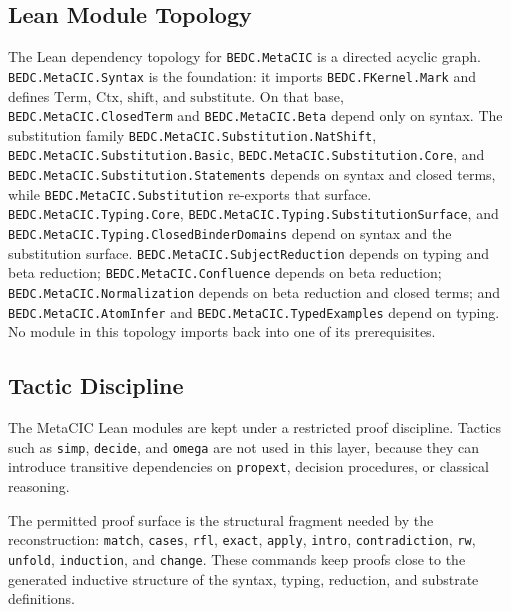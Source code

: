 \subsection{Lean Module Topology}\label{subsec:reconstruction-module-topology}

The Lean dependency topology for \texttt{BEDC.MetaCIC} is a directed acyclic
graph. \texttt{BEDC.MetaCIC.Syntax} is the foundation: it imports
\texttt{BEDC.FKernel.Mark} and defines $\mathrm{Term}$, $\mathrm{Ctx}$,
$\mathrm{shift}$, and $\mathrm{substitute}$. On that base,
\texttt{BEDC.MetaCIC.ClosedTerm} and \texttt{BEDC.MetaCIC.Beta} depend only
on syntax. The substitution family
\texttt{BEDC.MetaCIC.Substitution.NatShift},
\texttt{BEDC.MetaCIC.Substitution.Basic},
\texttt{BEDC.MetaCIC.Substitution.Core}, and
\texttt{BEDC.MetaCIC.Substitution.Statements} depends on syntax and closed
terms, while \texttt{BEDC.MetaCIC.Substitution} re-exports that surface.
\texttt{BEDC.MetaCIC.Typing.Core},
\texttt{BEDC.MetaCIC.Typing.SubstitutionSurface}, and
\texttt{BEDC.MetaCIC.Typing.ClosedBinderDomains} depend on syntax and the
substitution surface. \texttt{BEDC.MetaCIC.SubjectReduction} depends on
typing and beta reduction; \texttt{BEDC.MetaCIC.Confluence} depends on beta
reduction; \texttt{BEDC.MetaCIC.Normalization} depends on beta reduction and
closed terms; and \texttt{BEDC.MetaCIC.AtomInfer} and
\texttt{BEDC.MetaCIC.TypedExamples} depend on typing. No module in this
topology imports back into one of its prerequisites.

\subsection{Tactic Discipline}\label{subsec:reconstruction-tactic-discipline}

The MetaCIC Lean modules are kept under a restricted proof discipline. Tactics
such as \texttt{simp}, \texttt{decide}, and \texttt{omega} are not used in
this layer, because they can introduce transitive dependencies on
\texttt{propext}, decision procedures, or classical reasoning.

The permitted proof surface is the structural fragment needed by the
reconstruction: \texttt{match}, \texttt{cases}, \texttt{rfl},
\texttt{exact}, \texttt{apply}, \texttt{intro}, \texttt{contradiction},
\texttt{rw}, \texttt{unfold}, \texttt{induction}, and \texttt{change}.
These commands keep proofs close to the generated inductive structure of the
syntax, typing, reduction, and substrate definitions.

